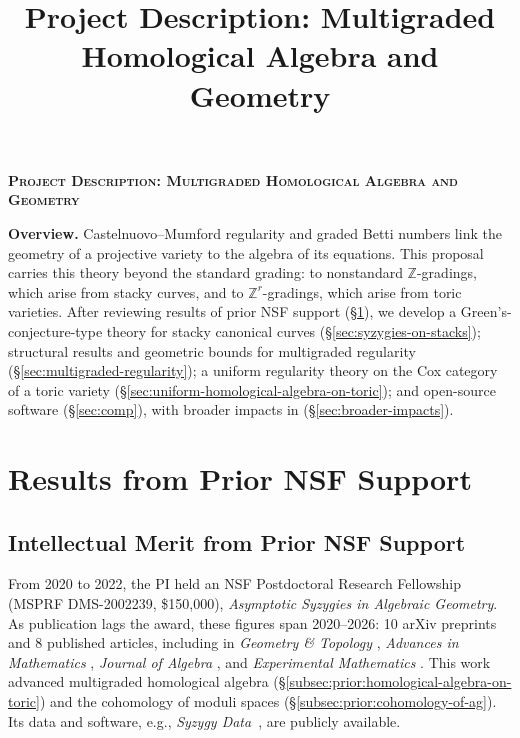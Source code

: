 \documentclass[11pt,reqno]{amsart}
\title{Project Description: Multigraded Homological Algebra and Geometry}
\theoremstyle{remark}
\newcommand{\ZZ}{\mathbb{Z}}
\begin{document}
\thispagestyle{empty}
\pagestyle{empty}
\begingroup
  \centering
  \large\scshape\bfseries Project Description: Multigraded Homological Algebra and Geometry\\[1em]
\endgroup

\setcounter{section}{0}

\noindent\textbf{Overview.} Castelnuovo--Mumford regularity and graded Betti numbers link the geometry of a projective variety to the algebra of its equations. This proposal carries this theory beyond the standard grading: to nonstandard $\ZZ$-gradings, which arise from stacky curves, and to $\ZZ^r$-gradings, which arise from toric varieties. After reviewing results of prior NSF support (\S\ref{sec:prior-work}), we develop a Green's-conjecture-type theory for stacky canonical curves (\S\ref{sec:syzygies-on-stacks}); structural results and geometric bounds for multigraded regularity (\S\ref{sec:multigraded-regularity}); a uniform regularity theory on the Cox category of a toric variety (\S\ref{sec:uniform-homological-algebra-on-toric}); and open-source software (\S\ref{sec:comp}), with broader impacts in (\S\ref{sec:broader-impacts}).

\section{Results from Prior NSF Support}\label{sec:prior-work}

\subsection{Intellectual Merit from Prior NSF Support}

From 2020 to 2022, the PI held an NSF Postdoctoral Research Fellowship (MSPRF DMS-2002239, \$150,000), \textit{Asymptotic Syzygies in Algebraic Geometry}. As publication lags the award, these figures span 2020--2026: 10 arXiv preprints \cite{BCEGLY22,bruceHellerSayrafi26,bruceHellerSayrafi22,brandtBruceCorey23,BBCMMW24,ABBCV25,bruceHellerSayrafiSeceleanu25,ABBCV26,BBZ26,bruce26} and 8 published articles, including in \textit{Geometry \& Topology} \cite{BBCMMW24}, \textit{Advances in Mathematics} \cite{bruceHellerSayrafi26}, \textit{Journal of Algebra} \cite{BCEGLY22}, and \textit{Experimental Mathematics} \cite{BEGY20}. This work advanced multigraded homological algebra (\S\ref{subsec:prior:homological-algebra-on-toric}) and the cohomology of moduli spaces (\S\ref{subsec:prior:cohomology-of-ag}). Its data and software, e.g., \textit{Syzygy Data}~\cite{BEGY20,BCEGLY22}, are publicly available.
\end{document}
